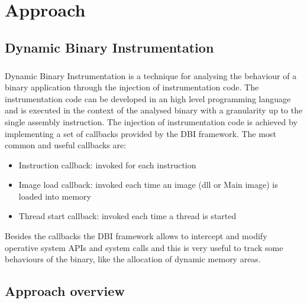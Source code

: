 \chapter{Approach}
\label{chapter3}
\thispagestyle{empty}

\section{Dynamic Binary Instrumentation}
\paragraph{}
Dynamic Binary Instrumentation is a technique for analysing the behaviour of a binary application through the injection of instrumentation code. The instrumentation code can be developed in an high level programming language and is executed in the context of the analysed binary with a granularity up to the single assembly instruction. The injection of instrumentation code is achieved by implementing a set of callbacks provided by the \ac{DBI} framework. The most common and useful callbacks are:
\begin{itemize}
 \item Instruction callback: invoked for each instruction
 \item Image load callback: invoked each time an image (dll or Main image) is loaded into memory
 \item Thread start callback: invoked each time a thread is started
\end{itemize}
Besides the callbacks the \ac{DBI} framework allows to intercept and modify operative system \acp{API} and system calls and this is very useful to track some behaviours of the binary, like the allocation of dynamic memory areas.

\section{Approach overview}
